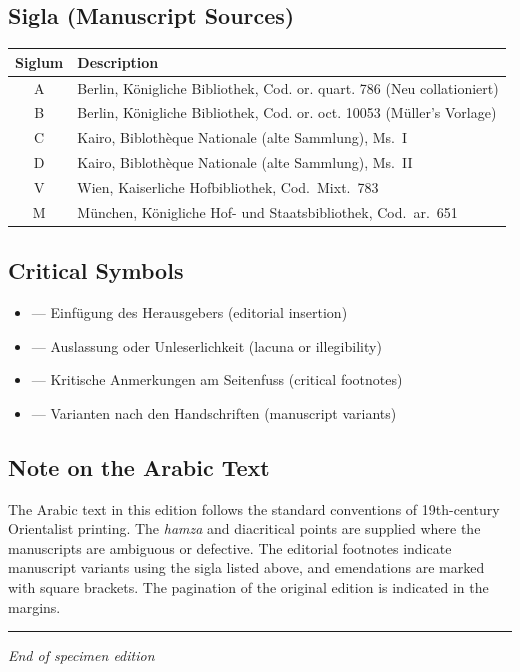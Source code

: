 \documentclass[11pt,a4paper]{article}
\begin{document}
\subsection{Sigla (Manuscript Sources)}

\begin{longtable}{cl}
\toprule
\textbf{Siglum} & \textbf{Description} \\
\midrule
\endhead
\bottomrule
\endfoot
A & Berlin, Königliche Bibliothek, Cod. or. quart. 786 (Neu collationiert) \\
B & Berlin, Königliche Bibliothek, Cod. or. oct. 10053 (Müller's Vorlage) \\
C & Kairo, Biblothèque Nationale (alte Sammlung), Ms.~I \\
D & Kairo, Biblothèque Nationale (alte Sammlung), Ms.~II \\
V & Wien, Kaiserliche Hofbibliothek, Cod.~Mixt.~783 \\
M & München, Königliche Hof- und Staatsbibliothek, Cod.~ar.~651 \\
\bottomrule
\end{longtable}

\subsection{Critical Symbols}

\begin{itemize}[leftmargin=2em]
  \item [\textbf{[]}] --- Einfügung des Herausgebers (editorial insertion)
  \item [\textbf{$\langle$ $\rangle$}] --- Auslassung oder Unleserlichkeit (lacuna or illegibility)
  \item [\textbf{a), b), c)}] --- Kritische Anmerkungen am Seitenfuss (critical footnotes)
  \item [\textbf{BC}, \textbf{A}, etc.] --- Varianten nach den Handschriften (manuscript variants)
\end{itemize}

\subsection{Note on the Arabic Text}

The Arabic text in this edition follows the standard conventions of 19th-century Orientalist printing. The \textit{hamza} and diacritical points are supplied where the manuscripts are ambiguous or defective. The editorial footnotes indicate manuscript variants using the sigla listed above, and emendations are marked with square brackets. The pagination of the original edition is indicated in the margins.

\vspace{1cm}
\noindent\rule{\textwidth}{0.4pt}

\begin{center}
\textit{End of specimen edition}
\end{center}
\end{document}
